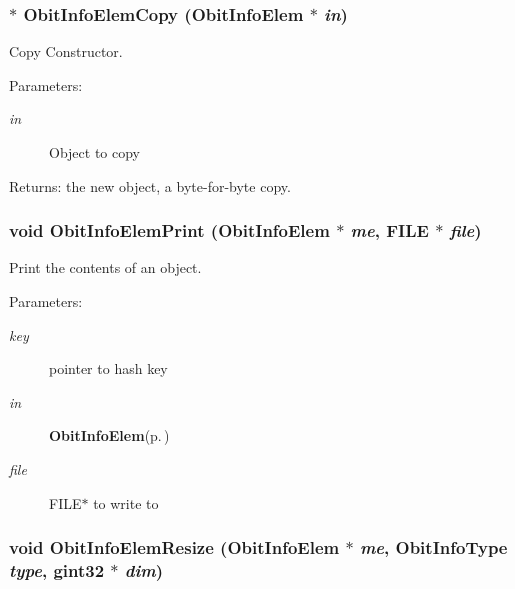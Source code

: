 \subsubsection{$\ast$ Obit\-Info\-Elem\-Copy ({\bf Obit\-Info\-Elem} $\ast$ {\em in})}\label{ObitInfoElem_8c_a1}


Copy Constructor. 

\begin{Desc}
\item[Parameters:]
\begin{description}
\item[{\em in}]Object to copy \end{description}
\end{Desc}
\begin{Desc}
\item[Returns:]the new object, a byte-for-byte copy. \end{Desc}
\subsubsection{\setlength{\rightskip}{0pt plus 5cm}void Obit\-Info\-Elem\-Print ({\bf Obit\-Info\-Elem} $\ast$ {\em me}, FILE $\ast$ {\em file})}\label{ObitInfoElem_8c_a9}


Print the contents of an object. 

\begin{Desc}
\item[Parameters:]
\begin{description}
\item[{\em key}]pointer to hash key \item[{\em in}]{\bf Obit\-Info\-Elem}{\rm (p.\,\pageref{structObitInfoElem})} \item[{\em file}]FILE$\ast$ to write to \end{description}
\end{Desc}
\subsubsection{\setlength{\rightskip}{0pt plus 5cm}void Obit\-Info\-Elem\-Resize ({\bf Obit\-Info\-Elem} $\ast$ {\em me}, Obit\-Info\-Type {\em type}, gint32 $\ast$ {\em dim})}\label{ObitInfoElem_8c_a7}


